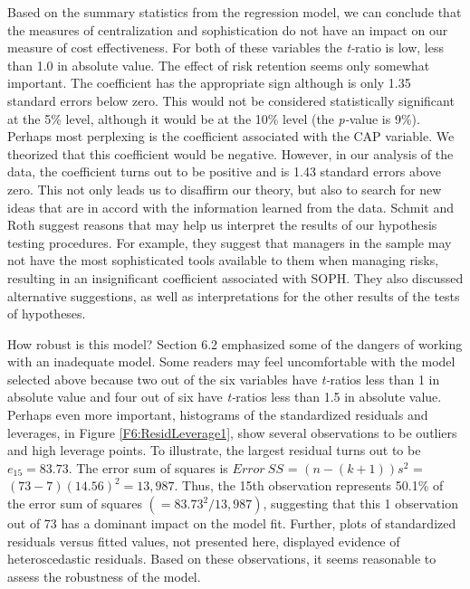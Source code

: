 Based on the summary statistics from the regression model, we can
conclude that the measures of centralization and sophistication do
not have an impact on our measure of cost effectiveness. For both of
these variables the \textit{t-}ratio is low, less than 1.0 in
absolute value. The effect of risk retention seems only somewhat
important. The coefficient has the appropriate sign although is only
1.35 standard errors below zero. This would not be considered
statistically significant at the 5\% level, although it would be at
the 10\% level (the \textit{p-}value is 9\%). Perhaps most
perplexing is the coefficient associated with the CAP variable. We
theorized that this coefficient would be negative. However, in our
analysis of the data, the coefficient turns out to be positive and
is 1.43 standard errors above zero. This not only leads us to
disaffirm our theory, but also to search for new ideas that are in
accord with the information learned from the data. Schmit and Roth
suggest reasons that may help us interpret the results of our
hypothesis testing procedures. For example, they suggest that
managers in the sample may not have the most sophisticated tools
available to them when managing risks, resulting in an insignificant
coefficient associated with SOPH. They also discussed alternative
suggestions, as well as interpretations for the other results of the
tests of hypotheses.

How robust is this model? Section 6.2 emphasized some of the dangers
of working with an inadequate model. Some readers may feel
uncomfortable with the model selected above because two out of the
six variables have \textit{t-}ratios less than 1 in absolute value
and four out of six have \textit{t-}ratios less than 1.5 in absolute
value. Perhaps even more important, histograms of the standardized
residuals and leverages, in Figure \ref{F6:ResidLeverage1}, show
several observations to be outliers and high leverage points. To
illustrate, the largest residual turns out to be $e_{15}=83.73$. The
error sum of squares is $Error~SS$ = $(n-(k+1))s^{2}$ =
$(73-7)(14.56)^{2}=13,987$. Thus, the
15th observation represents 50.1\% of the error sum of squares $%
(=83.73^{2}/13,987)$, suggesting that this 1 observation out of 73
has a dominant impact on the model fit. Further, plots of
standardized residuals versus fitted values, not presented here,
displayed evidence of heteroscedastic residuals. Based on these
observations, it seems reasonable to assess the robustness of the
model.


